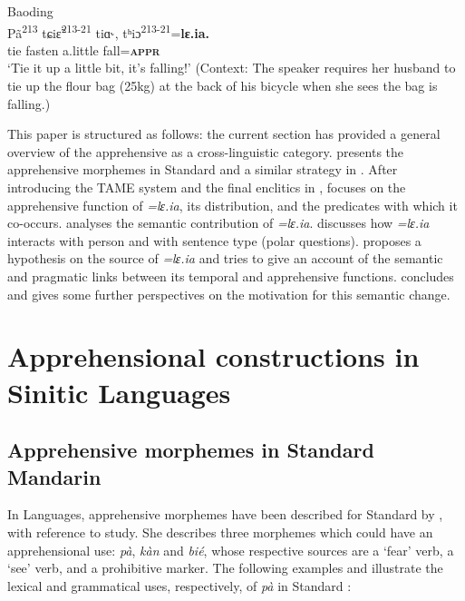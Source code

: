 \documentclass[output=paper,colorlinks,citecolor=brown, language=chinese]{langscibook}
\begin{document}
\ea\label{ex:Song4} \textnormal{Baoding}\\
\gll Pã\textsuperscript{213} tɕiɛ̃\textsuperscript{213-21} tiɑ˞, tʰiɔ\textsuperscript{213-21}=\textbf{lɛ.ia.} \\
tie fasten a.little fall=\textsc{\textbf{appr}} \\
\glt `Tie it up a little bit, it's falling!' (Context: The speaker requires her husband to tie up the flour bag (25kg) at the back of his bicycle when she sees the bag is falling.)
\z

This paper is structured as follows: the current section has provided a general overview of the apprehensive as a cross-linguistic category.  presents the apprehensive morphemes in Standard  and a similar strategy in . After introducing the TAME system and the final enclitics in ,  focuses on the apprehensive function of \textit{=lɛ.ia}, its distribution, and the predicates with which it co-occurs.  analyses the semantic contribution of \textit{=lɛ.ia}.  discusses how \textit{=lɛ.ia}  interacts with person and with sentence type (polar questions).  proposes a hypothesis on the source of \textit{=lɛ.ia} and tries to give an account of the semantic and pragmatic links between its temporal and apprehensive functions.  concludes and gives some further perspectives on the motivation for this semantic change.


\section{Apprehensional constructions in Sinitic Languages}
\label{sec:apprsinitic}

\subsection{Apprehensive morphemes in Standard Mandarin}
\label{subsec:apprmandarin}

In  Languages, apprehensive morphemes have been described for Standard  by \citet{Gao2003}, with reference to  study. She describes three morphemes  which could have an apprehensional use: \textit{pà}, \textit{kàn} and \textit{bié}, whose respective sources are a `fear' verb, a `see' verb, and a prohibitive marker. The following examples  and  illustrate the lexical and grammatical uses, respectively, of \textit{pà} in Standard :
\end{document}
